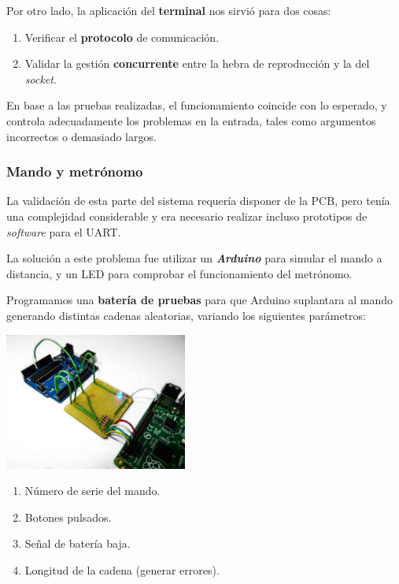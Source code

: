 \documentclass[10pt,a4paper]{article}
\begin{document}
	
	Por otro lado, la aplicación del \textbf{terminal} nos sirvió para dos cosas:
	
	\begin{enumerate}
		\item Verificar el \textbf{protocolo} de comunicación.
		\item Validar la gestión \textbf{concurrente} entre la hebra de reproducción y la del \textit{socket}.
	\end{enumerate}
	
	En base a las pruebas realizadas, el funcionamiento coincide con lo esperado, y controla adecuadamente los problemas en la entrada, tales como argumentos incorrectos o demasiado largos.
	
	\subsubsection*{Mando y metrónomo}
	
	La validación de esta parte del sistema requería disponer de la PCB, pero tenía una complejidad considerable y era necesario realizar incluso prototipos de \textit{software} para el UART.
	
	La solución a este problema fue utilizar un \textbf{\textit{Arduino}} para simular el mando a distancia, y un LED para comprobar el funcionamiento del metrónomo.
	
	Programamos una \textbf{batería de pruebas} para que Arduino suplantara al mando generando distintas cadenas aleatorias, variando los siguientes parámetros:
	
	\begin{multicols}{2}
		\noindent
		\begin{center}
			\includegraphics[width=0.45\textwidth]{images/proto_uart} 
		\end{center}
		\columnbreak
		\begin{enumerate}
			\item Número de serie del mando.
			\item Botones pulsados.
			\item Señal de batería baja.
			\item Longitud de la cadena (generar errores).
		\end{enumerate}
	\end{multicols}
\end{document}
